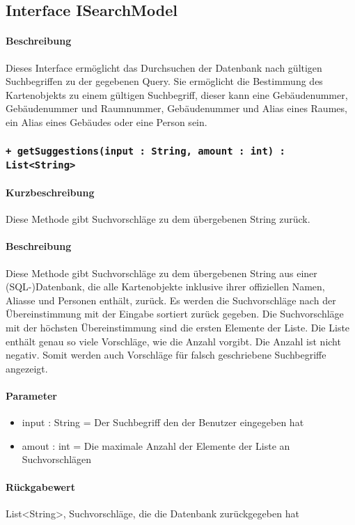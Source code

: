 \subsection{Interface ISearchModel}
\paragraph*{Beschreibung}
Dieses Interface ermöglicht das Durchsuchen der Datenbank nach gültigen Suchbegriffen zu der gegebenen Query.
Sie ermöglicht die Bestimmung des Kartenobjekts zu einem gültigen Suchbegriff, 
dieser kann eine Gebäudenummer, Gebäudenummer und Raumnummer, Gebäudenummer und Alias eines Raumes, ein Alias eines Gebäudes oder eine Person sein.

\subsubsection{\texttt{+ getSuggestions(input : String, amount : int) : List<String>}}%
\paragraph*{Kurzbeschreibung}
Diese Methode gibt Suchvorschläge zu dem übergebenen String zurück.
\paragraph*{Beschreibung}
Diese Methode gibt Suchvorschläge zu dem übergebenen String aus einer (SQL-)Datenbank, 
die alle Kartenobjekte inklusive ihrer offiziellen Namen, Aliasse und Personen enthält, zurück.
Es werden die Suchvorschläge nach der Übereinstimmung mit der Eingabe sortiert zurück gegeben.
Die Suchvorschläge mit der höchsten Übereinstimmung sind die ersten Elemente der Liste.
Die Liste enthält genau so viele Vorschläge, wie die Anzahl vorgibt. Die Anzahl ist nicht negativ.
Somit werden auch Vorschläge für falsch geschriebene Suchbegriffe angezeigt.
\paragraph*{Parameter}
\begin{itemize}
    \item input : String = Der Suchbegriff den der Benutzer eingegeben hat
    \item amout : int = Die maximale Anzahl der Elemente der Liste an Suchvorschlägen
\end{itemize}
\paragraph*{Rückgabewert}
List<String>, Suchvorschläge, die die Datenbank zurückgegeben hat
